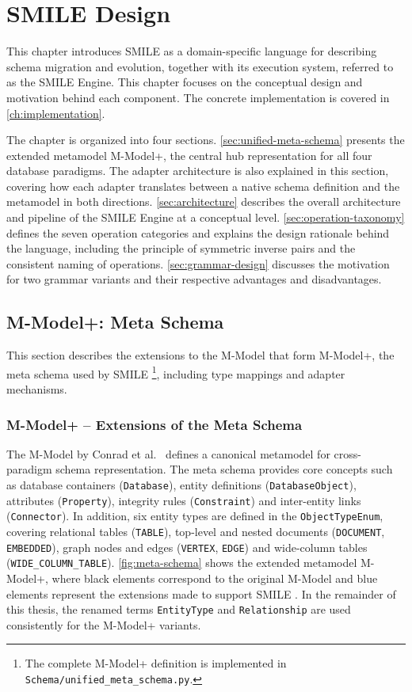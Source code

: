 \chapter{SMILE  Design}\label{ch:concept}
\newcommand{\TT}[1]{\texttt{#1}}


  This chapter introduces SMILE  as a domain-specific language for describing schema migration and evolution, together with its execution system, referred to as the SMILE  Engine. This chapter focuses on the conceptual design and motivation behind each component. The concrete implementation is covered in \autoref{ch:implementation}.

  The chapter is organized into four sections. \autoref{sec:unified-meta-schema} presents the extended metamodel M-Model+, the central hub
  representation for all four database paradigms. The adapter architecture is also explained in this section, covering how each adapter
  translates between a native schema definition and the metamodel in both directions. \autoref{sec:architecture} describes the overall architecture and pipeline
  of the SMILE  Engine at a conceptual level. \autoref{sec:operation-taxonomy} defines the seven operation categories and explains the design rationale
  behind the language, including the principle of symmetric inverse pairs and the consistent naming of operations. \autoref{sec:grammar-design}
  discusses the motivation for two grammar variants and their respective advantages and disadvantages.


\section{M-Model+: Meta Schema}\label{sec:unified-meta-schema}
  This section describes the extensions to the M-Model that form M-Model+, the meta schema used by SMILE \footnote{The complete M-Model+ definition is implemented in \texttt{Schema/unified\_meta\_schema.py}.}, including type mappings and adapter mechanisms.

\subsection{M-Model+ -- Extensions of the Meta Schema}\label{subsec:meta-extensions}

The M-Model by Conrad et al.~\cite{conrad2022metamodels} defines a canonical metamodel for cross-paradigm schema representation. The meta schema
provides core concepts such as database containers (\texttt{Database}), entity definitions (\texttt{DatabaseObject}), attributes (\texttt{Property}), integrity rules (\texttt{Constraint}) and inter-entity links (\texttt{Connector}). In addition, six entity types are defined in the \texttt{ObjectTypeEnum}, covering relational tables (\texttt{TABLE}), top-level and nested documents (\texttt{DOCUMENT}, \texttt{EMBEDDED}), graph nodes and edges (\texttt{VERTEX}, \texttt{EDGE}) and wide-column tables (\texttt{WIDE\_COLUMN\_TABLE}). \autoref{fig:meta-schema} shows the extended metamodel M-Model+, where black elements correspond to the original M-Model and blue elements represent the extensions made to support SMILE . In the remainder of this thesis, the renamed terms \texttt{EntityType} and \texttt{Relationship} are used consistently for the M-Model+ variants.


